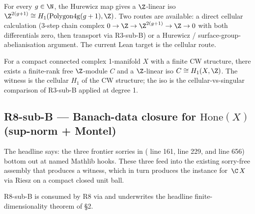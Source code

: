 \begin{lemma}
\label{lem:r3subD-polygon-hurewicz}
For every \(g\in\N\), the Hurewicz map gives a \(\Z\)-linear iso
\(\Z^{2(g+1)}\cong H_{1}(\mathrm{Polygon4g}(g+1),\Z)\).  Two routes are
available: a direct cellular calculation (3-step chain complex
\(0\to\Z\to\Z^{2(g+1)}\to\Z\to0\) with both differentials zero, then
transport via R3-sub-B) or a Hurewicz / surface-group-abelianisation
argument.  The current Lean target is the cellular route.
\leanok
\end{lemma}

\begin{lemma}
\label{lem:r3subD-cellular-singular-surface}
For a compact connected complex 1-manifold \(X\) with a finite CW
structure, there exists a finite-rank free \(\Z\)-module \(C\) and a
\(\Z\)-linear iso \(C\cong H_{1}(X,\Z)\).  The witness is the cellular
\(H_{1}\) of the CW structure; the iso is the cellular-vs-singular
comparison of R3-sub-B applied at degree 1.
\leanok
\end{lemma}

\subsection{R8-sub-B --- Banach-data closure for \(\mathrm{Hone}(X)\) (sup-norm + Montel)}
\label{subsec:gap-R8subB-banach-closure}

The headline says: the three frontier sorries in
( line 161,
 line 229, and
 line 656) bottom
out at named Mathlib hooks.  These three feed into the existing
sorry-free assembly that produces a  witness, which in turn produces the
 instance for \(\,\C\,X\)
via Riesz on a compact closed unit ball.

R8-sub-B is consumed by R8 via
and underwrites the headline finite-dimensionality theorem
 of \S2.

